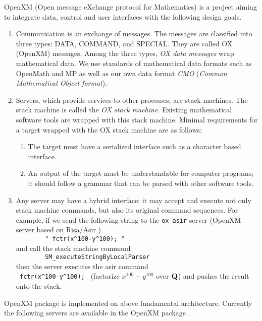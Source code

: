 %
%
OpenXM (Open message eXchange protocol for Mathematics)
is a project aiming to integrate data, control and user interfaces
with the following design goals.

\begin{enumerate}
\item Communication is an exchange of messages. The messages are classified into
three types:
DATA, COMMAND, and SPECIAL.
They are called OX (OpenXM) messages.
Among the three types,
{\it OX data messages} wrap mathematical data.
We use standards of mathematical data formats such as OpenMath and MP
as well as our own data format {\it CMO}
({\it Common Mathematical Object format}).
\item Servers, which provide services to other processes, are stack machines.
The stack machine is called the
{\it OX stack machine}.
Existing mathematical software tools are wrapped with this stack machine.
Minimal requirements for a target wrapped with the OX stack machine
are as follows:
\begin{enumerate}
\item The target must have a serialized interface such as a character based
interface.
\item An output of the target must be understandable for computer programs;
it should follow a grammar that can be parsed with other software tools.
\end{enumerate}
\item Any server may have a hybrid interface;
it may accept and execute not only stack machine commands, 
but also its original command sequences.
For example,
if we send the following string to the {\tt ox\_asir} server 
(OpenXM server based on Risa/Asir \cite{asir}) \\
\verb+        " fctr(x^100-y^100); "      + \\
and call the stack machine command  \\
\verb+        SM_executeStringByLocalParser    + \\ 
then the server executes the asir command \\
\verb+ fctr(x^100-y^100); + 
(factorize $x^{100}-y^{100}$ over ${\bf Q}$)
and pushes the result onto the stack.
\end{enumerate}
OpenXM package  is implemented on above fundamental architecture.
Currently the following servers are available in the OpenXM package
\cite{openxm-web}.

